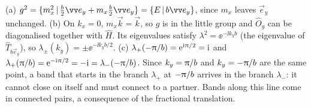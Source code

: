 \begin{solution}
(a) $g^2=\seitz{m_x^2}{\tfrac{b}{2}\vec{e}_y+m_x\tfrac{b}{2}\vec{e}_y}=\seitz{E}{b\vec{e}_y}$, since
$m_x$ leaves $\vec{e}_y$ unchanged.
(b) On $k_x=0$, $m_x\vec{k}=\vec{k}$, so $g$ is in the little group and $\hat{O}_g$ can be
diagonalised together with $\hat{H}$. Its eigenvalues satisfy
$\lambda^2=\ee^{-\ii k_yb}$ (the eigenvalue of $\hat{T}_{b\vec{e}_y}$), so
$\lambda_\pm(k_y)=\pm\ee^{-\ii k_yb/2}$.
(c) $\lambda_+(-\uppi/b)=\mathrm{e}^{\mathrm{i}\uppi/2}=\mathrm{i}$ and $\lambda_+(\uppi/b)=\mathrm{e}^{-\mathrm{i}\uppi/2}=-\mathrm{i}=\lambda_-(-\uppi/b)$.
Since $k_y=\uppi/b$ and $k_y=-\uppi/b$ are the same point, a band that starts in the
branch $\lambda_+$ at $-\uppi/b$ arrives in the branch $\lambda_-$: it cannot close on itself
and must connect to a partner. Bands along this line come in connected pairs, a
consequence of the fractional translation.
\end{solution}
